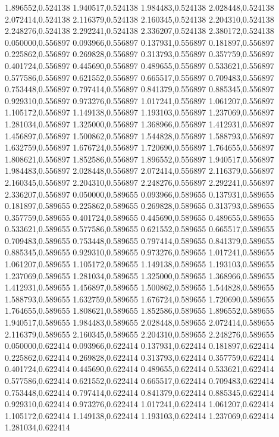 1.896552,0.524138
1.940517,0.524138
1.984483,0.524138
2.028448,0.524138
2.072414,0.524138
2.116379,0.524138
2.160345,0.524138
2.204310,0.524138
2.248276,0.524138
2.292241,0.524138
2.336207,0.524138
2.380172,0.524138
0.050000,0.556897
0.093966,0.556897
0.137931,0.556897
0.181897,0.556897
0.225862,0.556897
0.269828,0.556897
0.313793,0.556897
0.357759,0.556897
0.401724,0.556897
0.445690,0.556897
0.489655,0.556897
0.533621,0.556897
0.577586,0.556897
0.621552,0.556897
0.665517,0.556897
0.709483,0.556897
0.753448,0.556897
0.797414,0.556897
0.841379,0.556897
0.885345,0.556897
0.929310,0.556897
0.973276,0.556897
1.017241,0.556897
1.061207,0.556897
1.105172,0.556897
1.149138,0.556897
1.193103,0.556897
1.237069,0.556897
1.281034,0.556897
1.325000,0.556897
1.368966,0.556897
1.412931,0.556897
1.456897,0.556897
1.500862,0.556897
1.544828,0.556897
1.588793,0.556897
1.632759,0.556897
1.676724,0.556897
1.720690,0.556897
1.764655,0.556897
1.808621,0.556897
1.852586,0.556897
1.896552,0.556897
1.940517,0.556897
1.984483,0.556897
2.028448,0.556897
2.072414,0.556897
2.116379,0.556897
2.160345,0.556897
2.204310,0.556897
2.248276,0.556897
2.292241,0.556897
2.336207,0.556897
0.050000,0.589655
0.093966,0.589655
0.137931,0.589655
0.181897,0.589655
0.225862,0.589655
0.269828,0.589655
0.313793,0.589655
0.357759,0.589655
0.401724,0.589655
0.445690,0.589655
0.489655,0.589655
0.533621,0.589655
0.577586,0.589655
0.621552,0.589655
0.665517,0.589655
0.709483,0.589655
0.753448,0.589655
0.797414,0.589655
0.841379,0.589655
0.885345,0.589655
0.929310,0.589655
0.973276,0.589655
1.017241,0.589655
1.061207,0.589655
1.105172,0.589655
1.149138,0.589655
1.193103,0.589655
1.237069,0.589655
1.281034,0.589655
1.325000,0.589655
1.368966,0.589655
1.412931,0.589655
1.456897,0.589655
1.500862,0.589655
1.544828,0.589655
1.588793,0.589655
1.632759,0.589655
1.676724,0.589655
1.720690,0.589655
1.764655,0.589655
1.808621,0.589655
1.852586,0.589655
1.896552,0.589655
1.940517,0.589655
1.984483,0.589655
2.028448,0.589655
2.072414,0.589655
2.116379,0.589655
2.160345,0.589655
2.204310,0.589655
2.248276,0.589655
0.050000,0.622414
0.093966,0.622414
0.137931,0.622414
0.181897,0.622414
0.225862,0.622414
0.269828,0.622414
0.313793,0.622414
0.357759,0.622414
0.401724,0.622414
0.445690,0.622414
0.489655,0.622414
0.533621,0.622414
0.577586,0.622414
0.621552,0.622414
0.665517,0.622414
0.709483,0.622414
0.753448,0.622414
0.797414,0.622414
0.841379,0.622414
0.885345,0.622414
0.929310,0.622414
0.973276,0.622414
1.017241,0.622414
1.061207,0.622414
1.105172,0.622414
1.149138,0.622414
1.193103,0.622414
1.237069,0.622414
1.281034,0.622414
